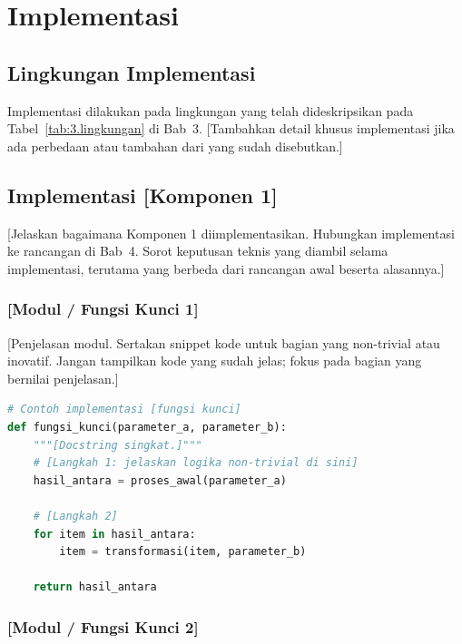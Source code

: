 
\chapter{Implementasi}

\section{Lingkungan Implementasi}
\label{sec:5.1}

Implementasi dilakukan pada lingkungan yang telah dideskripsikan pada
Tabel~\ref{tab:3.lingkungan} di Bab~3. [Tambahkan detail khusus implementasi jika ada
perbedaan atau tambahan dari yang sudah disebutkan.]

\section{Implementasi [Komponen 1]}
\label{sec:5.2}

[Jelaskan bagaimana Komponen 1 diimplementasikan. Hubungkan implementasi ke rancangan
di Bab~4. Sorot keputusan teknis yang diambil selama implementasi, terutama yang berbeda
dari rancangan awal beserta alasannya.]

\subsection{[Modul / Fungsi Kunci 1]}
\label{sec:5.2.1}

[Penjelasan modul. Sertakan snippet kode untuk bagian yang non-trivial atau inovatif.
Jangan tampilkan kode yang sudah jelas; fokus pada bagian yang bernilai penjelasan.]

\begin{lstlisting}[language=Python, caption={[Deskripsi Kode Sumber 1]}, label={lst:5.kode1}]
# Contoh implementasi [fungsi kunci]
def fungsi_kunci(parameter_a, parameter_b):
    """[Docstring singkat.]"""
    # [Langkah 1: jelaskan logika non-trivial di sini]
    hasil_antara = proses_awal(parameter_a)

    # [Langkah 2]
    for item in hasil_antara:
        item = transformasi(item, parameter_b)

    return hasil_antara
\end{lstlisting}

\subsection{[Modul / Fungsi Kunci 2]}
\label{sec:5.2.2}

